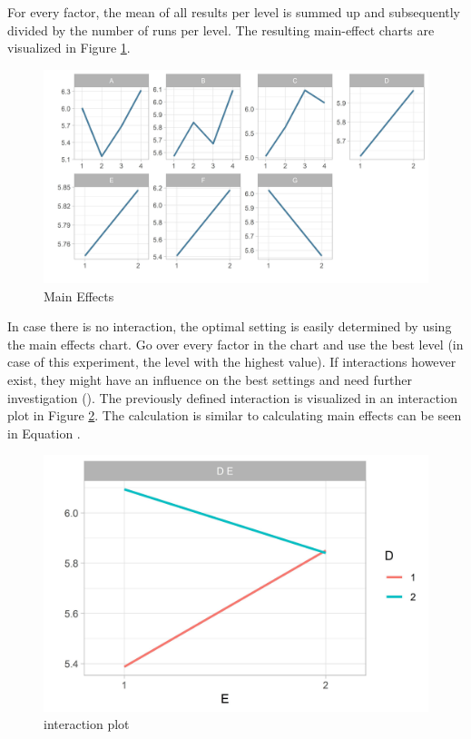 For every factor, the mean of all results per level is summed up and subsequently divided by the number of runs per level. The resulting main-effect charts are visualized in Figure \ref{fig:hyperparam_tuning:main_effects}.

\begin{figure}[ht] 
	\includegraphics[width=1\linewidth]{simulations/taguchi/plots/main_effects}
	\caption{Main Effects}
	\label{fig:hyperparam_tuning:main_effects}
\end{figure}


In case there is no interaction, the optimal setting is easily determined by using the main effects chart. Go over every factor in the chart and use the best level (in case of this experiment, the level with the highest value). If interactions however exist, they might have an influence on the best settings and need further investigation (\cite{yang_design_2009}). The previously defined interaction is visualized in an interaction plot in Figure \ref{fig:hyperparam_tuning:interaction_plot}. The calculation is similar to calculating main effects can be seen in Equation .

\begin{figure}[ht] 
	\centering
	\includegraphics[width=0.4\linewidth]{simulations/taguchi/plots/test_of_interaction}
	\caption{interaction plot}
	\label{fig:hyperparam_tuning:interaction_plot}
\end{figure}

